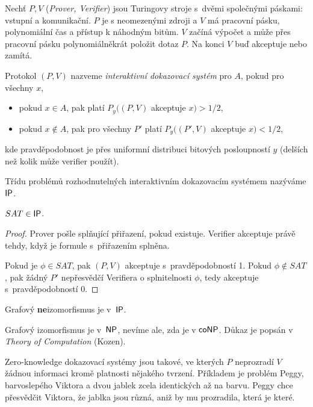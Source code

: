\begin{definition}
    Nechť $P, V$ ({\em Prover, Verifier}) jsou Turingovy stroje s~dvěmi
    společnými páskami: vstupní a komunikační. $P$ je s neomezenými
    zdroji a $V$ má pracovní pásku, polynomiální čas a přístup k
    náhodným bitům. $V$ začíná výpočet a může přes pracovní pásku
    polynomiálněkrát položit dotaz $P$. Na konci $V$ buď akceptuje
    nebo zamítá.

    Protokol $(P,V)$ nazveme {\em interaktivní dokazovací systém} pro
    $A$, pokud pro všechny $x$,
    \begin{itemize}
        \item pokud $x \in A$, pak platí $P_y((P,V)$ akceptuje $x) > 1/2$,
        \item pokud $x \not \in A$, pak pro všechny $P'$ platí $P_y((P',V)$
            akceptuje $x) < 1/2$,
    \end{itemize}
    kde pravděpodobnost je přes uniformní distribuci bitových
    posloupností $y$ (delších než kolik může verifier použít).

    Třídu problémů rozhodnutelných interaktivním dokazovacím systémem nazýváme
    ${\mathsf{IP}}$.
\end{definition}

\begin{theorem}
    $SAT \in {\ensuremath{\mathsf{IP}}}$.
\end{theorem}

\begin{proof}
    Prover pošle splňující přiřazení, pokud existuje. Verifier
    akceptuje právě tehdy, když je formule s~přiřazením splněna.

    Pokud je $\phi \in SAT$, pak $(P,V)$ akceptuje s~pravděpodobností 1.
    Pokud $\phi \not \in SAT$, pak žádný $P'$ nepřesvědčí Verifiera o
    splnitelnosti $\phi$, tedy akceptuje s~pravděpodobností 0.
\end{proof}

\begin{theorem}
    Grafový {\bf ne}izomorfismus je v~${\mathsf{IP}}$.
\end{theorem}

Grafový izomorfismus je v~${\mathsf{NP}}$, nevíme ale, zda je v ${\mathsf{coNP}}$.
Důkaz je popsán v {\em Theory of Computation} (Kozen).


Zero-knowledge dokazovací systémy jsou takové, ve kterých $P$ neprozradí
$V$ žádnou informaci kromě platnosti nějakého tvrzení. Příkladem je
problém Peggy, barvoslepého Viktora a dvou jablek zcela identických až
na barvu. Peggy chce přesvědčit Viktora, že jablka jsou různá, aniž by
mu prozradila, která je které.


